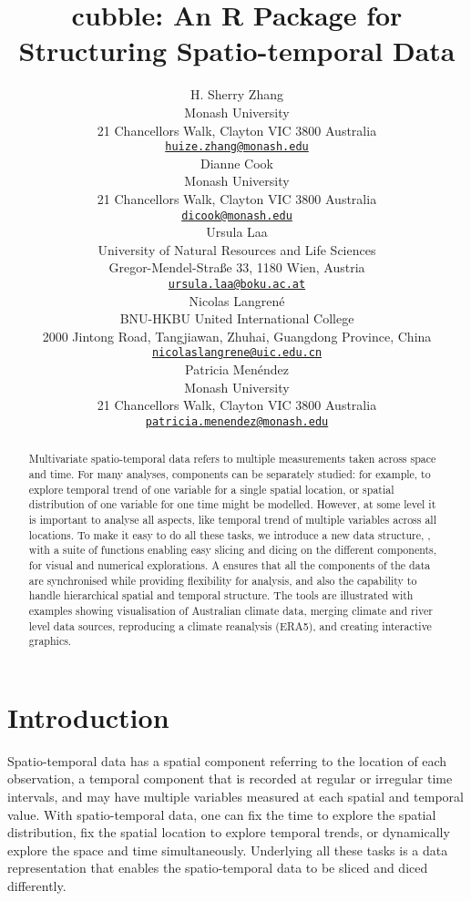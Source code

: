 \documentclass{article}
\title{cubble: An R Package for Structuring Spatio-temporal Data}
\author{
    H. Sherry Zhang
   \\
    Monash University \\
  21 Chancellors Walk, Clayton VIC 3800 Australia \\
  \texttt{\href{mailto:huize.zhang@monash.edu}{\nolinkurl{huize.zhang@monash.edu}}} \\
   \And
    Dianne Cook
   \\
    Monash University \\
  21 Chancellors Walk, Clayton VIC 3800 Australia \\
  \texttt{\href{mailto:dicook@monash.edu}{\nolinkurl{dicook@monash.edu}}} \\
   \And
    Ursula Laa
   \\
    University of Natural Resources and Life Sciences \\
  Gregor-Mendel-Straße 33, 1180 Wien, Austria \\
  \texttt{\href{mailto:ursula.laa@boku.ac.at}{\nolinkurl{ursula.laa@boku.ac.at}}} \\
   \And
    Nicolas Langrené
   \\
    BNU-HKBU United International College \\
  2000 Jintong Road, Tangjiawan, Zhuhai, Guangdong Province, China \\
  \texttt{\href{mailto:nicolaslangrene@uic.edu.cn}{\nolinkurl{nicolaslangrene@uic.edu.cn}}} \\
   \And
    Patricia Menéndez
   \\
    Monash University \\
  21 Chancellors Walk, Clayton VIC 3800 Australia \\
  \texttt{\href{mailto:patricia.menendez@monash.edu}{\nolinkurl{patricia.menendez@monash.edu}}} \\
  }
\begin{document}
\maketitle


\begin{abstract}
Multivariate spatio-temporal data refers to multiple measurements taken across space and time. For many analyses, components can be separately studied: for example, to explore temporal trend of one variable for a single spatial location, or spatial distribution of one variable for one time might be modelled. However, at some level it is important to analyse all aspects, like temporal trend of multiple variables across all locations. To make it easy to do all these tasks, we introduce a new data structure, , with a suite of functions enabling easy slicing and dicing on the different components, for visual and numerical explorations. A  ensures that all the components of the data are synchronised while providing flexibility for analysis, and also the capability to handle hierarchical spatial and temporal structure. The tools are illustrated with examples showing visualisation of Australian climate data, merging climate and river level data sources, reproducing a climate reanalysis (ERA5), and creating interactive graphics.
\end{abstract}


\newpage

\hypertarget{introduction}{%
\section{Introduction}\label{introduction}}

Spatio-temporal data has a spatial component referring to the location of each observation, a temporal component that is recorded at regular or irregular time intervals, and may have multiple variables measured at each spatial and temporal value. With spatio-temporal data, one can fix the time to explore the spatial distribution, fix the spatial location to explore temporal trends, or dynamically explore the space and time simultaneously. Underlying all these tasks is a data representation that enables the spatio-temporal data to be sliced and diced differently.
\end{document}
